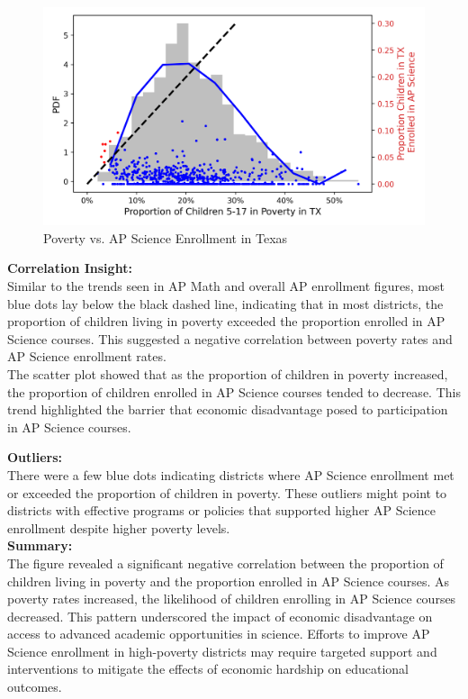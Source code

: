 \documentclass[sn-mathphys-num]{sn-jnl}%
\theoremstyle{thmstyleone}%
\theoremstyle{thmstyletwo}%
\theoremstyle{thmstylethree}%
\begin{document}
{\begin{figure}[h]
    \includegraphics[]{Poverty_vs_APScience_TX.png}
    \caption{Poverty vs. AP Science Enrollment in Texas}
    \label{fig:APScience}
\end{figure}

\textbf{Correlation Insight:}\\

Similar to the trends seen in AP Math and overall AP enrollment figures, most blue dots lay below the black dashed line, indicating that in most districts, the proportion of children living in poverty exceeded the proportion enrolled in AP Science courses. This suggested a negative correlation between poverty rates and AP Science enrollment rates.\\

The scatter plot showed that as the proportion of children in poverty increased, the proportion of children enrolled in AP Science courses tended to decrease. This trend highlighted the barrier that economic disadvantage posed to participation in AP Science courses.\\
\pagebreak

\textbf{Outliers:}\\

There were a few blue dots indicating districts where AP Science enrollment met or exceeded the proportion of children in poverty. These outliers might point to districts with effective programs or policies that supported higher AP Science enrollment despite higher poverty levels.\\

\textbf{Summary:}\\

The figure revealed a significant negative correlation between the proportion of children living in poverty and the proportion enrolled in AP Science courses. As poverty rates increased, the likelihood of children enrolling in AP Science courses decreased. This pattern underscored the impact of economic disadvantage on access to advanced academic opportunities in science. Efforts to improve AP Science enrollment in high-poverty districts may require targeted support and interventions to mitigate the effects of economic hardship on educational outcomes.\\

}
\end{document}
